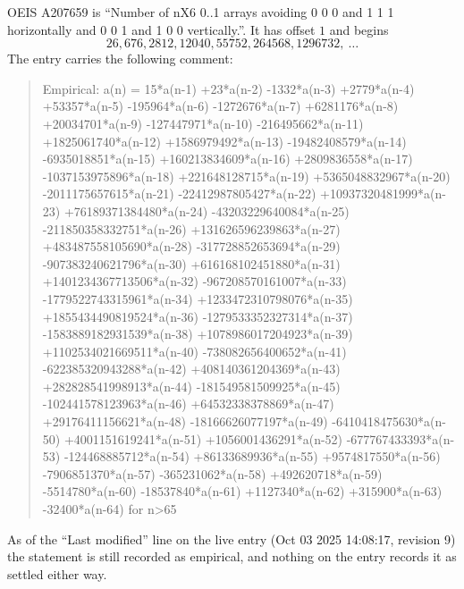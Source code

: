 \documentclass[11pt,a4paper]{article}
\theoremstyle{plain}
\theoremstyle{definition}
\begin{document}
OEIS A207659 is ``Number of nX6 0..1 arrays avoiding 0 0 0 and 1 1 1 horizontally and 0 0 1 and 1 0 0 vertically.''. It has offset
$1$ and begins
\[
26, 676, 2812, 12040, 55752, 264568, 1296732,\ \dots
\]
The entry carries the following comment:
\begin{quote}\small
Empirical: a(n) = 15*a(n-1) +23*a(n-2) -1332*a(n-3) +2779*a(n-4) +53357*a(n-5) -195964*a(n-6) -1272676*a(n-7) +6281176*a(n-8) +20034701*a(n-9) -127447971*a(n-10) -216495662*a(n-11) +1825061740*a(n-12) +1586979492*a(n-13) -19482408579*a(n-14) -6935018851*a(n-15) +160213834609*a(n-16) +2809836558*a(n-17) -1037153975896*a(n-18) +221648128715*a(n-19) +5365048832967*a(n-20) -2011175657615*a(n-21) -22412987805427*a(n-22) +10937320481999*a(n-23) +76189371384480*a(n-24) -43203229640084*a(n-25) -211850358332751*a(n-26) +131626596239863*a(n-27) +483487558105690*a(n-28) -317728852653694*a(n-29) -907383240621796*a(n-30) +616168102451880*a(n-31) +1401234367713506*a(n-32) -967208570161007*a(n-33) -1779522743315961*a(n-34) +1233472310798076*a(n-35) +1855434490819524*a(n-36) -1279533352327314*a(n-37) -1583889182931539*a(n-38) +1078986017204923*a(n-39) +1102534021669511*a(n-40) -738082656400652*a(n-41) -622385320943288*a(n-42) +408140361204369*a(n-43) +282828541998913*a(n-44) -181549581509925*a(n-45) -102441578123963*a(n-46) +64532338378869*a(n-47) +29176411156621*a(n-48) -18166626077197*a(n-49) -6410418475630*a(n-50) +4001151619241*a(n-51) +1056001436291*a(n-52) -677767433393*a(n-53) -124468885712*a(n-54) +86133689936*a(n-55) +9574817550*a(n-56) -7906851370*a(n-57) -365231062*a(n-58) +492620718*a(n-59) -5514780*a(n-60) -18537840*a(n-61) +1127340*a(n-62) +315900*a(n-63) -32400*a(n-64) for n>65
\end{quote}
As of the ``Last modified'' line on the live entry (Oct 03 2025 14:08:17, revision
9) the statement is still recorded as empirical, and nothing on the entry
records it as settled either way.
\end{document}
